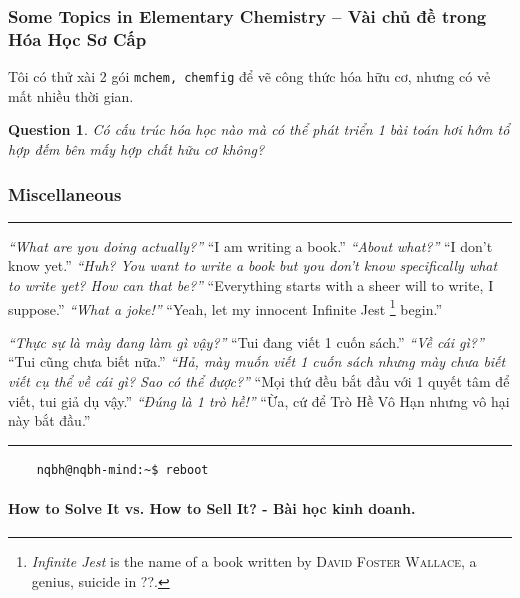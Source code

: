 \documentclass[12pt]{article}
\newtheorem{question}{Question}
\begin{document}
\subsubsection{Some Topics in Elementary Chemistry -- Vài chủ đề trong Hóa Học Sơ Cấp}
Tôi có thử xài 2 gói {\tt mchem, chemfig} để vẽ công thức hóa hữu cơ, nhưng có vẻ mất nhiều thời gian.

\begin{question}
	Có cấu trúc hóa học nào mà có thể phát triển 1 bài toán hơi hớm tổ hợp đếm bên mấy hợp chất hữu cơ không?
\end{question}


\subsubsection{Miscellaneous}
\hrule
\begin{multicols}{2}\small
	{\it ``What are you doing actually?''} ``I am writing a book.'' {\it ``About what?''} ``I don't know yet.'' {\it ``Huh? You want to write a book but you don't know specifically what to write yet? How can that be?''} ``Everything starts with a sheer will to write, I suppose.'' {\it ``What a joke!''} ``Yeah, let my innocent Infinite Jest \footnote{{\it Infinite Jest} is the name of a book written by \textsc{David Foster Wallace}, a genius, suicide in ??.} begin.''
	\columnbreak
	
	{\it ``Thực sự là mày đang làm gì vậy?''} ``Tui đang viết 1 cuốn sách.'' {\it ``Về cái gì?''} ``Tui cũng chưa biết nữa.'' {\it ``Hả, mày muốn viết 1 cuốn sách nhưng mày chưa biết viết cụ thể về cái gì? Sao có thể được?''} ``Mọi thứ đều bắt đầu với 1 quyết tâm để viết, tui giả dụ vậy.'' {\it ``Đúng là 1 trò hề!''} ``Ừa, cứ để Trò Hề Vô Hạn nhưng vô hại này bắt đầu.''	
\end{multicols}
\hrule
\noindent
\begin{verbatim}
	nqbh@nqbh-mind:~$ reboot
\end{verbatim}

\paragraph{How to Solve It vs. How to Sell It? - Bài học kinh doanh.}
	
\end{document}
